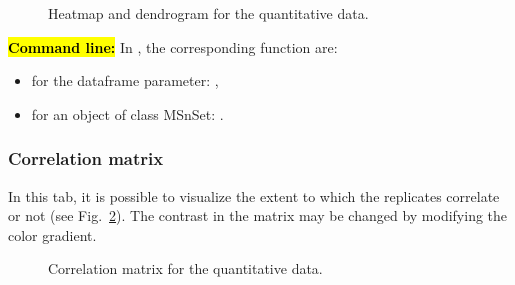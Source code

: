 \documentclass[12pt]{article}
\begin{document}
\begin {figure}
\centering
{}
\caption{Heatmap and dendrogram for the quantitative data.}\label{fig:sdhm}
\end {figure}

\hl{\bf Command line:} In , the corresponding function are:
\begin{itemize}
\item for the dataframe parameter: ,
\item for an object of class MSnSet: .
\end{itemize}

\subsubsection {Correlation matrix}

{In this tab, it is possible to visualize the extent to which the replicates 
correlate or not (see Fig.~\ref{fig:sdcm}). The contrast in the matrix may be 
changed by modifying the color gradient.}

\begin {figure}
\centering
{}
\caption{Correlation matrix for the quantitative data.}\label{fig:sdcm}
\end {figure}
\end{document}
